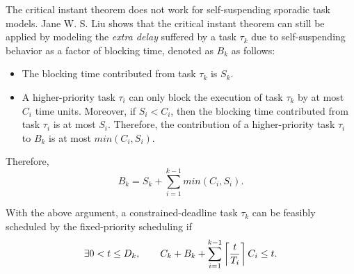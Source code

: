 The critical instant theorem does not work for self-suspending sporadic task models.  
Jane W. S. Liu \cite{Liu:2000:RS:518501} shows that the critical instant theorem can still be applied by modeling the \emph{extra delay} suffered by a task $\tau_k$ due to self-suspending behavior as a factor of blocking time, denoted as $B_k$ as follows:
\begin{itemize}
\item The blocking time contributed from task $\tau_k$ is $S_k$.
\item A higher-priority task $\tau_i$ can only block the execution of task $\tau_k$ by at most $C_i$ time units. Moreover, if $S_i < C_i$, then the blocking time contributed from task $\tau_i$ is at most $S_i$. Therefore, the contribution of a higher-priority task $\tau_i$  to $B_k$ is at most $min(C_i, S_i)$.
\end{itemize}
Therefore, 
\begin{equation}
\label{eq:Bk}
B_k = S_k + \sum_{i=1}^{k-1} min(C_i, S_i).
\end{equation}

With the above argument, a constrained-deadline task $\tau_k$ can be feasibly scheduled by the fixed-priority scheduling if
\begin{equation}
\label{eq:TDA-suspension}
\exists 0 < t \leq D_k, \qquad C_k + B_k + \sum_{i=1}^{k-1}\left\lceil{\frac{t}{T_i}}\right\rceil C_i \leq t.
\end{equation}
  
  